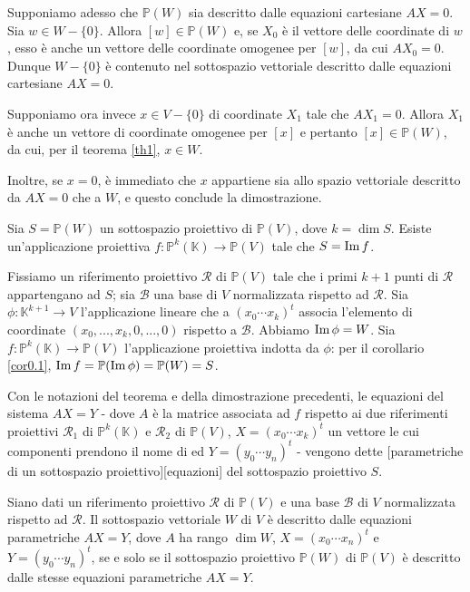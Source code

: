 	\par Supponiamo adesso che $\mathbb{P}(W)$ sia descritto dalle equazioni cartesiane $AX = 0$. Sia $w \in W - \lbrace 0 \rbrace$. Allora $[w] \in \mathbb{P}(W)$ e, se $X_0$ \`e il vettore delle coordinate di $w$, esso \`e anche un vettore delle coordinate omogenee per $[w]$, da cui $AX_0 = 0$. Dunque $W - \lbrace 0 \rbrace$ \`e contenuto nel sottospazio vettoriale descritto dalle equazioni cartesiane $AX = 0$.
	\par Supponiamo ora invece $x \in V - \lbrace 0 \rbrace$ di coordinate $X_1$ tale che $AX_1 = 0$. Allora $X_1$ \`e anche un vettore di coordinate omogenee per $[x]$ e pertanto $[x] \in \mathbb{P}(W)$, da cui, per il teorema \ref{th1}, $x \in W$.
	\par Inoltre, se $x = 0$, \`e immediato che $x$ appartiene sia allo spazio vettoriale descritto da $AX = 0$ che a $W$, e questo conclude la dimostrazione. \EndProof
\begin{Theorem}\label{th23}
	Sia $S = \mathbb{P}(W)$ un sottospazio proiettivo di $\mathbb{P}(V)$, dove $k = \dim S$. Esiste un'applicazione proiettiva $f: \mathbb{P}^k(\mathbb{K}) \rightarrow \mathbb{P}(V)$ tale che $S = \operatorname{Im} f$.
\end{Theorem}
\Proof Fissiamo un riferimento proiettivo $\mathcal{R}$ di $\mathbb{P}(V)$ tale che i primi $k + 1$ punti di $\mathcal{R}$ appartengano ad $S$; sia $\mathcal{B}$ una base di $V$ normalizzata rispetto ad $\mathcal{R}$. Sia $\phi: \mathbb{K}^{k + 1} \rightarrow V$ l'applicazione lineare che a $(x_0 \cdots x_k)^t$ associa l'elemento di coordinate $(x_0, ..., x_k, 0, ..., 0)$ rispetto a $\mathcal{B}$. Abbiamo $\operatorname{Im} \phi = W$. Sia $f: \mathbb{P}^k(\mathbb{K}) \rightarrow \mathbb{P}(V)$ l'applicazione proiettiva indotta da $\phi$: per il corollario \ref{cor0.1}, $\operatorname{Im} f = \mathbb{P}(\operatorname{Im} \phi) = \mathbb{P}(W) = S$. \EndProof
\begin{Definition}\label{def23}
	Con le notazioni del teorema e della dimostrazione precedenti, le equazioni del sistema $AX = Y$ - dove $A$ \`e la matrice associata ad $f$ rispetto ai due riferimenti proiettivi $\mathcal{R}_1$ di $\mathbb{P}^k(\mathbb{K})$ e $\mathcal{R}_2$ di $\mathbb{P}(V)$, $X = (x_0 \cdots x_k)^t$ un vettore le cui componenti prendono il nome di  ed $Y = (y_0 \cdots y_n)^t$ - vengono dette [parametriche di un sottospazio proiettivo][equazioni] del sottospazio proiettivo $S$.
\end{Definition}
\begin{Theorem}\label{th24}
	Siano dati un riferimento proiettivo $\mathcal{R}$ di $\mathbb{P}(V)$ e una base $\mathcal{B}$ di $V$ normalizzata rispetto ad $\mathcal{R}$. Il sottospazio vettoriale $W$ di $V$ \`e descritto dalle equazioni parametriche $AX = Y$, dove $A$ ha rango $\dim W$, $X = (x_0 \cdots x_n)^t$ e $Y = (y_0 \cdots y_n)^t$, se e solo se il sottospazio proiettivo $\mathbb{P}(W)$ di $\mathbb{P}(V)$ \`e descritto dalle stesse equazioni parametriche $AX = Y$.
\end{Theorem}
